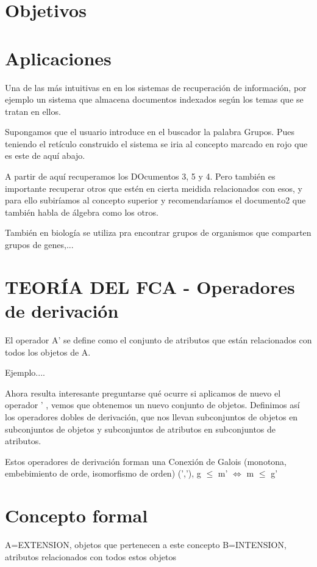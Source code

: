 \documentclass{article}
\begin{document}
\section{Objetivos}


\section{Aplicaciones}

Una de las más intuitivas en en los sistemas de recuperación de información, por ejemplo un sistema que almacena documentos indexados según los temas que se tratan en ellos. 

Supongamos que el usuario introduce en el buscador la palabra Grupos. Pues teniendo el retículo construido el sistema se iria al concepto marcado en rojo que es este de aquí abajo.  

A partir de aquí recuperamos los DOcumentos 3, 5 y 4. Pero también es importante recuperar otros que estén en cierta meidida relacionados con esos, y para ello subiríamos al concepto superior y recomendaríamos el documento2 que también habla de álgebra como los otros.


También en biología se utiliza pra encontrar grupos de organismos que comparten grupos de genes,...

\section{TEORÍA DEL FCA - Operadores de derivación}

El operador A' se define como el conjunto de atributos que están relacionados con todos los objetos de A. 

Ejemplo....

Ahora resulta interesante preguntarse qué ocurre si aplicamos de nuevo el operador ' , vemos que obtenemos un nuevo conjunto de objetos. Definimos así los operadores dobles de derivación, que nos llevan subconjuntos de objetos en subconjuntos de objetos y subconjuntos de atributos en subconjuntos de atributos.

Estos operadores de derivación forman una Conexión de Galois (monotona, embebimiento de orde, isomorfismo de orden) (','), g $\leq$ m' $\Longleftrightarrow$ m $\leq$ g'

\section{Concepto formal} 

A=EXTENSION, objetos que pertenecen a este concepto
B=INTENSION, atributos relacionados con todos estos objetos
\end{document}
